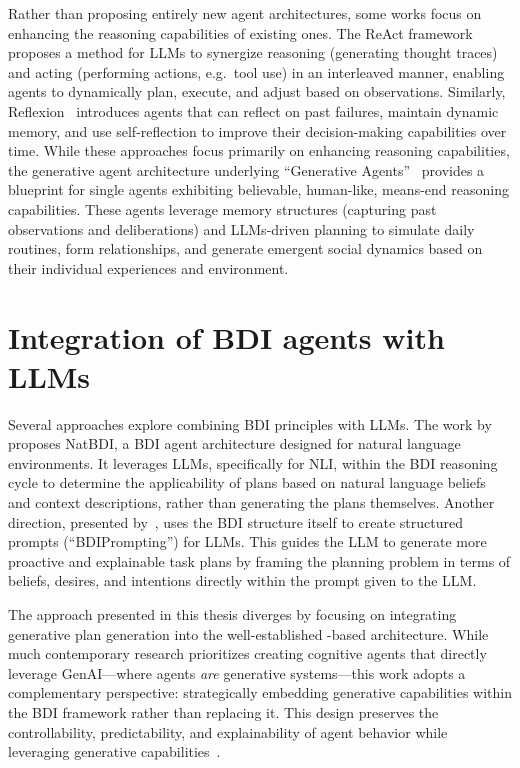 \documentclass[12pt,a4paper,openright,twoside]{book}
\begin{document}
Rather than proposing entirely new agent architectures, some works focus on enhancing the reasoning capabilities of existing ones.
%
The \ac{ReAct} framework~\cite{YaoZYDSN023} proposes a method for \acp{LLM} to synergize reasoning (generating thought traces) and acting (performing actions, e.g.\, tool use) in an interleaved manner, enabling agents to dynamically plan, execute, and adjust based on observations.
%
Similarly, Reflexion~\cite{ShinnCGNY23} introduces agents that can reflect on past failures,
maintain dynamic memory, and use self-reflection to improve their decision-making capabilities over time.
%
While these approaches focus primarily on enhancing reasoning capabilities, the generative agent architecture underlying ``Generative Agents''~\cite{ParkOCMLB23} provides a blueprint for single agents exhibiting believable, human-like, means-end reasoning capabilities.
%
These agents leverage memory structures (capturing past observations and deliberations) and \acp{LLM}-driven planning to simulate daily routines, form relationships, and generate emergent social dynamics based on their individual experiences and environment.

\section{Integration of BDI agents with LLMs}\label{sec:bdi-llm-integration}

Several approaches explore combining \ac{BDI} principles with \acp{LLM}.
%
The work by~\cite{IchidaM024} proposes NatBDI, a \ac{BDI} agent architecture designed for natural language environments.
%
It leverages \acp{LLM}, specifically for \ac{NLI}, within the \ac{BDI} reasoning cycle to determine the applicability of plans based on natural language beliefs and context descriptions, rather than generating the plans themselves.
%
Another direction, presented by~\cite{JangYCO023}, uses the \ac{BDI} structure itself to create structured prompts (``BDIPrompting'') for \acp{LLM}.
%
This guides the \ac{LLM} to generate more proactive and explainable task plans by framing the planning problem in terms of beliefs, desires, and intentions directly within the prompt given to the \ac{LLM}.

The approach presented in this thesis diverges by focusing on integrating generative plan generation into the well-established \agentspeak{}-based architecture. 
%
While much contemporary research prioritizes creating cognitive agents that directly leverage \ac{GenAI}—where agents \emph{are} generative systems—this work adopts a complementary perspective: strategically embedding generative capabilities within the \ac{BDI} framework rather than replacing it. 
%
This design preserves the controllability, predictability, and explainability of agent behavior while leveraging generative capabilities~\cite{ricci2024atal}.
\end{document}
